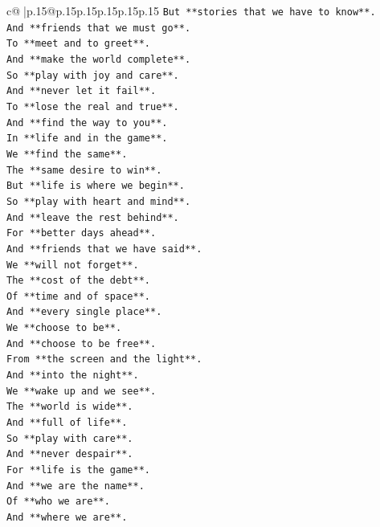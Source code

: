\documentclass{article}
\begin{document}
{\begin{supertabular}{c@{$\;$}|p{.15\linewidth}@{}p{.15\linewidth}p{.15\linewidth}p{.15\linewidth}p{.15\linewidth}p{.15\linewidth}}
{{{\texttt{But **stories that we have to know**.} \\
\texttt{And **friends that we must go**.} \\
\texttt{To **meet and to greet**.} \\
\texttt{And **make the world complete**.} \\
\texttt{So **play with joy and care**.} \\
\texttt{And **never let it fail**.} \\
\texttt{To **lose the real and true**.} \\
\texttt{And **find the way to you**.} \\
\texttt{In **life and in the game**.} \\
\texttt{We **find the same**.} \\
\texttt{The **same desire to win**.} \\
\texttt{But **life is where we begin**.} \\
\texttt{So **play with heart and mind**.} \\
\texttt{And **leave the rest behind**.} \\
\texttt{For **better days ahead**.} \\
\texttt{And **friends that we have said**.} \\
\texttt{We **will not forget**.} \\
\texttt{The **cost of the debt**.} \\
\texttt{Of **time and of space**.} \\
\texttt{And **every single place**.} \\
\texttt{We **choose to be**.} \\
\texttt{And **choose to be free**.} \\
\texttt{From **the screen and the light**.} \\
\texttt{And **into the night**.} \\
\texttt{We **wake up and we see**.} \\
\texttt{The **world is wide**.} \\
\texttt{And **full of life**.} \\
\texttt{So **play with care**.} \\
\texttt{And **never despair**.} \\
\texttt{For **life is the game**.} \\
\texttt{And **we are the name**.} \\
\texttt{Of **who we are**.} \\
\texttt{And **where we are**.} \\
}}}
\end{supertabular}}
\end{document}
